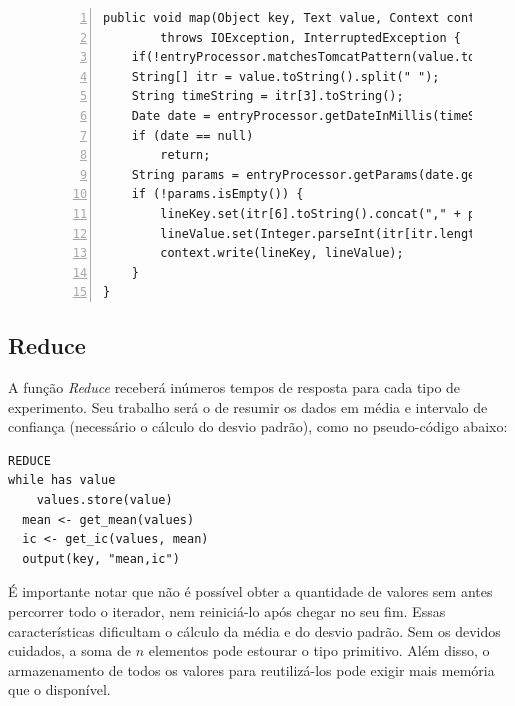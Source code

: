 \documentclass[brazil, a4paper,12pt]{article}
\begin{document}
\begin{figure} [!htb]
\begin{center}
\scriptsize
\begin{lstlisting}[numbers=left]
public void map(Object key, Text value, Context context)
		throws IOException, InterruptedException {
	if(!entryProcessor.matchesTomcatPattern(value.toString())) return;
	String[] itr = value.toString().split(" ");
	String timeString = itr[3].toString();
	Date date = entryProcessor.getDateInMillis(timeString.substring(1));
	if (date == null)
		return;
	String params = entryProcessor.getParams(date.getTime());
	if (!params.isEmpty()) {
		lineKey.set(itr[6].toString().concat("," + params));
		lineValue.set(Integer.parseInt(itr[itr.length - 1].toString()));
		context.write(lineKey, lineValue);
	}
}
\end{lstlisting}
\end{center}
\end{figure}

\subsection{Reduce}
A função \emph{Reduce} receberá inúmeros tempos de resposta para cada tipo de experimento. Seu trabalho será o de resumir os dados em média e intervalo de confiança (necessário o cálculo do desvio padrão), como no pseudo-código abaixo:

\begin{verbatim}
REDUCE
while has value
    values.store(value)
  mean <- get_mean(values)
  ic <- get_ic(values, mean)
  output(key, "mean,ic")
\end{verbatim}

É importante notar que não é possível obter a quantidade de valores sem antes percorrer todo o iterador, nem reiniciá-lo após chegar no seu fim. Essas características dificultam o cálculo da média e do desvio padrão. Sem os devidos cuidados, a soma de $n$ elementos pode estourar o tipo primitivo. Além disso, o armazenamento de todos os valores para reutilizá-los pode exigir mais memória que o disponível.
\end{document}
